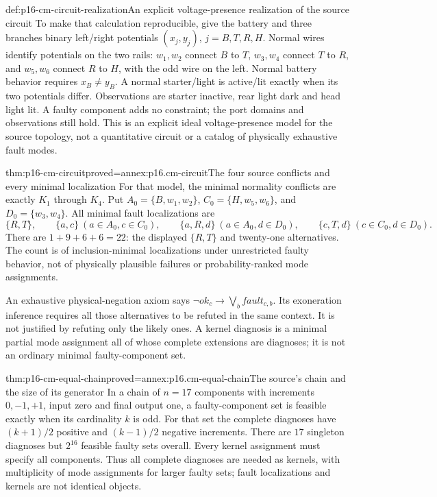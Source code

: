 \begin{hbdefinition}{def:p16-cm-circuit-realization}{An explicit voltage-presence realization of the source circuit}
To make that calculation reproducible, give the battery and three branches
binary left/right potentials \((x_j,y_j)\), \(j=B,T,R,H\).
Normal wires identify potentials on the two rails: \(w_1,w_2\) connect
\(B\) to \(T\), \(w_3,w_4\) connect \(T\) to \(R\), and
\(w_5,w_6\) connect \(R\) to \(H\), with the odd wire on the left.
Normal battery behavior requires \(x_B\ne y_B\). A normal starter/light
is active/lit exactly when its two potentials differ. Observations are
starter inactive, rear light dark and head light lit. A faulty component
adds no constraint; the port domains and observations still hold.
This is an explicit ideal voltage-presence model for the source topology,
not a quantitative circuit or a catalog of physically exhaustive fault modes.
\end{hbdefinition}

\begin{hbtheorem}{thm:p16-cm-circuit}{proved=annex:p16.cm-circuit}{The four source conflicts and every minimal localization}
For that model, the minimal normality conflicts are exactly \(K_1\)
through \(K_4\). Put \(A_0=\{B,w_1,w_2\}\),
\(C_0=\{H,w_5,w_6\}\), and \(D_0=\{w_3,w_4\}\).
All minimal fault localizations are
\[
 \{R,T\},\qquad
 \{a,c\}\ (a\in A_0,c\in C_0),\qquad
 \{a,R,d\}\ (a\in A_0,d\in D_0),\qquad
 \{c,T,d\}\ (c\in C_0,d\in D_0).
\]
There are \(1+9+6+6=22\): the displayed \(\{R,T\}\) and
twenty-one alternatives. The count is of inclusion-minimal localizations
under unrestricted faulty behavior, not of physically plausible failures
or probability-ranked mode assignments.
\end{hbtheorem}

An exhaustive physical-negation axiom says
\(\neg ok_c\to\bigvee_b fault_{c,b}\). Its exoneration inference
requires all those alternatives to be refuted in the same context. It is
not justified by refuting only the likely ones. A kernel diagnosis is a
minimal partial mode assignment all of whose complete extensions are
diagnoses; it is not an ordinary minimal faulty-component set.

\begin{hbtheorem}{thm:p16-cm-equal-chain}{proved=annex:p16.cm-equal-chain}{The source's chain and the size of its generator}
In a chain of \(n=17\) components with increments \(0,-1,+1\),
input zero and final output one, a faulty-component set is feasible exactly
when its cardinality \(k\) is odd. For that set the complete diagnoses have
\((k+1)/2\) positive and \((k-1)/2\) negative increments. There are
\(17\) singleton diagnoses but \(2^{16}\) feasible faulty sets overall.
Every kernel assignment must specify all components. Thus all complete
diagnoses are needed as kernels, with multiplicity of mode assignments for
larger faulty sets; fault localizations and kernels are not identical objects.
\end{hbtheorem}

